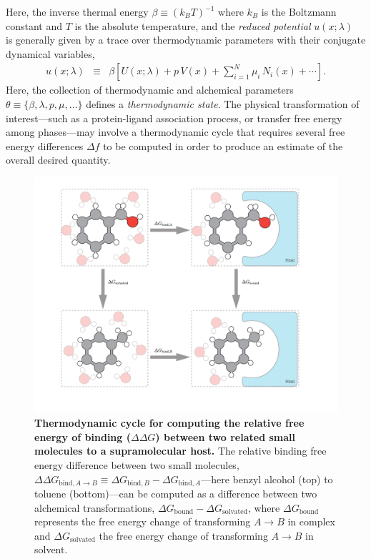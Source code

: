 \documentclass[9pt,bestpractices]{livecoms}
\begin{document}
Here, the inverse thermal energy $\beta \equiv (k_B T)^{-1}$ where $k_B$ is the Boltzmann constant and $T$ is the absolute temperature, and the \emph{reduced potential} $u(x; \lambda)$~\cite{shirts2008statistically} is generally given by a trace over thermodynamic parameters with their conjugate dynamical variables,
\begin{eqnarray}
u(x;\lambda) &\equiv& \beta \left[ U(x;\lambda) + p \, V(x) + \sum_{i=1}^N \mu_i \, N_i(x) + \cdots \right] . \label{equation:reduced-potential}
\end{eqnarray}
Here, the collection of thermodynamic and alchemical parameters $\theta \equiv \{\beta, \lambda, p, \mu, \ldots\}$ defines a \emph{thermodynamic state}.
The physical transformation of interest---such as a protein-ligand association process, or transfer free energy among phases---may involve a thermodynamic cycle that requires several free energy differences $\Delta f$ to be computed in order to produce an estimate of the overall desired quantity.

\begin{figure}
    \includegraphics[width=0.95\linewidth]{figures/fig2_therm_cyc/Figure.pdf}
    \caption{{\bf Thermodynamic cycle for computing the relative free energy of binding ($\Delta \Delta G$) between two related small molecules to a supramolecular host.}
    The relative binding free energy difference between two small molecules, $\Delta \Delta G_{\mathrm{bind}, A \rightarrow B} \equiv \Delta G_{\mathrm{bind}, B} - \Delta G_{\mathrm{bind}, A}$---here benzyl alcohol (top) to toluene (bottom)---can be computed as a difference between two alchemical transformations, $\Delta G_\mathrm{bound} - \Delta G_\mathrm{solvated}$, where $\Delta G_\mathrm{bound}$ represents the free energy change of transforming $A \rightarrow B$ in complex and $\Delta G_\mathrm{solvated}$ the free energy change of transforming $A \rightarrow B$ in solvent.}
    \label{fig:fig_binding_thermodynamic_cycle}
\end{figure}
\end{document}
